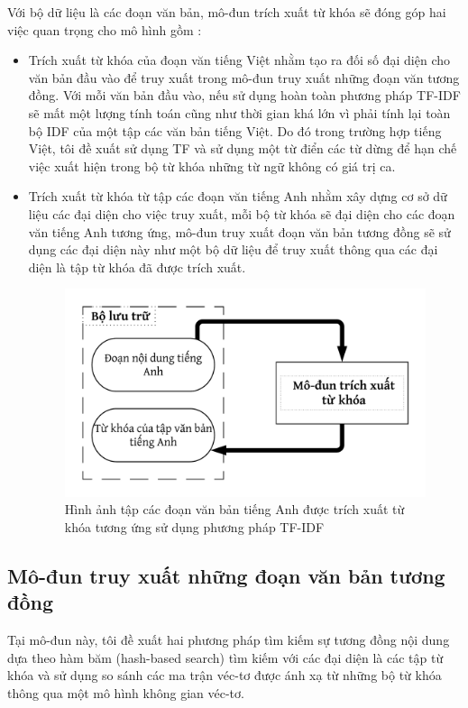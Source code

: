 \documentclass[12pt]{report}
\begin{document}
Với bộ dữ liệu là các đoạn văn bản, mô-đun trích xuất từ khóa sẽ đóng góp hai việc quan trọng cho mô hình gồm :
\begin{itemize}
	\item Trích xuất từ khóa của đoạn văn tiếng Việt nhằm tạo ra đối số đại diện cho văn bản đầu vào để truy xuất trong mô-đun truy xuất những đoạn văn tương đồng. Với mỗi văn bản đầu vào, nếu sử dụng hoàn toàn phương pháp TF-IDF sẽ mất một lượng tính toán cũng như thời gian khá lớn vì phải tính lại toàn bộ IDF của một tập các văn bản tiếng Việt. Do đó trong trường hợp tiếng Việt, tôi đề xuất sử dụng TF và sử dụng một từ điển các từ dừng để hạn chế việc xuất hiện trong bộ từ khóa những từ ngữ không có giá trị ca. 
	\item Trích xuất từ khóa từ tập các đoạn văn tiếng Anh nhằm xây dựng cơ sở dữ liệu các đại diện cho việc truy xuất, mỗi bộ từ khóa sẽ đại diện cho các đoạn văn tiếng Anh tương ứng, mô-đun truy xuất đoạn văn bản tương đồng sẽ sử dụng các đại diện này như một bộ dữ liệu để truy xuất thông qua các đại diện là tập từ khóa đã được trích xuất.
	\begin{figure}[h]
		\centering
		\includegraphics[scale=0.9]{tfidf}
		\caption{Hình ảnh tập các đoạn văn bản tiếng Anh được trích xuất từ khóa tương ứng sử dụng phương pháp TF-IDF}
	\end{figure}
\end{itemize}

\subsection{Mô-đun truy xuất những đoạn văn bản tương đồng}

Tại mô-đun này, tôi đề xuất hai phương pháp tìm kiếm sự tương đồng nội dung dựa theo hàm băm (hash-based search) tìm kiếm với các đại diện là các tập từ khóa và sử dụng so sánh các ma trận véc-tơ được ánh xạ từ những bộ từ khóa thông qua một mô hình không gian véc-tơ.
\end{document}
